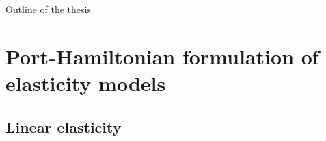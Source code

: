 \documentclass[aspectratio=169]{ISAE-Beamer}
\begin{document}
\begin{frame}{Outline of the thesis}
\begin{overlayarea}{\textwidth}{\textheight}
{\begin{figure}
	\end{figure}	
}
\end{overlayarea}
\end{frame}

\section{Port-Hamiltonian formulation of elasticity models}

\subsection{Linear elasticity}
\end{document}
